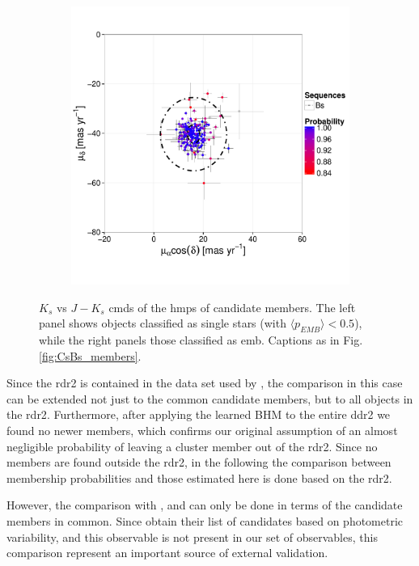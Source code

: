 \begin{figure}[ht!]
\begin{subfigure}[t]{0.45\textwidth}
     \includegraphics[page=9,width=\textwidth]{background/Figures/BHM/Bs_members.pdf}
    \end{subfigure}
\caption{$K_s$ vs $J-K_s$ \glspl{cmd} of the \gls{hmps} of candidate members. The left panel shows objects classified as single stars (with $\langle p_{EMB} \rangle < 0.5$), while the right panels those classified as \gls{emb}. Captions as in Fig. \ref{fig:CsBs_members}.}
\label{fig:CsBs_members2}
\end{figure}

Since the \gls{rdr2} is contained in the data set used by \citet{Bouy2015}, the comparison in this case can be extended not just to the common candidate members, but to all objects in the \gls{rdr2}. Furthermore, after applying the learned BHM to the entire \gls{ddr2} we found no newer members, which confirms our original assumption of an almost negligible probability of leaving a cluster member out of the \gls{rdr2}. Since no members are found outside the \gls{rdr2}, in the following the comparison between \citet{Bouy2015} membership probabilities and those estimated here is done based on the \gls{rdr2}.
 
 However, the comparison with \citet{Stauffer2007}, and \citet{Rebull2016} can only be done in terms of the candidate members in common. Since \citet{Rebull2016} obtain their list of candidates based on photometric variability, and this observable is not present in our set of observables, this comparison represent an important source of external validation. 


